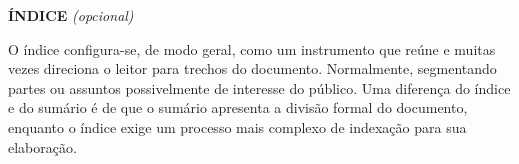 \begin{center} \textbf{ÍNDICE} \textit{(opcional)} \end{center}

O índice configura-se, de modo geral, como um instrumento que reúne e muitas vezes direciona o leitor para trechos do documento. Normalmente, segmentando partes ou assuntos possivelmente de interesse do público. Uma diferença do índice e do sumário é de que o sumário apresenta a divisão formal do documento, enquanto o índice exige um processo mais complexo de indexação para sua elaboração.